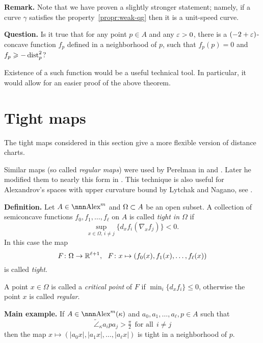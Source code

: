 \documentclass{article}
\begin{document}
\begin{thm}{\bf Remark.}\label{rmk:stronger-unit-speed} {\rm Note that we have proven
a slightly stronger statement; namely, if a curve $\gamma$ satisfies the
property~\ref{propr:weak-qg} then it is a unit-speed curve}.
\end{thm}

\begin{thm}
{\bf Question.} Is it true that for any point $p\in A$ and any $\varepsilon>0$, there is a
$(-2+\varepsilon)$-concave function $f_p$ defined in a neighborhood of $p$, such that $f_p(p)=0$ and
$f_p\geqslant-\operatorname{dist}_p^2$?
\end{thm}

Existence of a such function would be a useful technical tool. 
In particular, it
would allow for an easier proof of the above theorem.







\section{Tight maps}
\setcounter{subsection}{1}
\setcounter{thm}{0}


The tight maps considered in this section give a more flexible version of
distance charts.

Similar maps (so called \emph{regular maps}) were used by Perelman in \cite{perelman:spaces2} and \cite{perelman:morse}.
Later he modified them to nearly this form in \cite{perelman:DC}. 
This technique is also useful for Alexandrov's spaces with upper curvature bound by Lytchak and Nagano, see \cite{lytchak:DC}.

\begin{thm}{\bf Definition.}\label{def:tight} Let $A\in \Alex^m$ and $\Omega\subset
A$ be an open subset.
A collection of semiconcave functions
$f_0,f_1,\dots,f_\ell$ on $A$
is called \emph{tight in $\Omega$} if 
$$\sup_{x\in \Omega,\,i\not=j}\{d_x f_i(\nabla_x f_j)\}<0.$$
In this case the map 
$$F\colon\Omega\to \mathbb{R}^{\ell+1},\ \ F\colon x\mapsto (f_0(x),f_1(x),\dots,f_\ell(x))$$
is called \emph{tight}.

A point $x\in\Omega$ is called a \emph{critical point} of $F$ if $\min_i\{d_x f_i\}\le
0$, otherwise the point $x$ is called \emph{regular}.
\end{thm}


\begin{thm}{\bf Main example.} If $A\in\Alex^m(\kappa)$ and
$a_0,a_1,\dots,a_\ell,p\in A$ such that 
$$\tilde\angle_\kappa a_i p a_j>\tfrac\pi2\ \ \text{for all}\ \  i\not=j$$ 
then the map
$x\mapsto (|a_0x|,|a_1x|,\dots,|a_\ell x|)$ is tight in a neighborhood of
$p$.
\end{thm}
\end{document}
